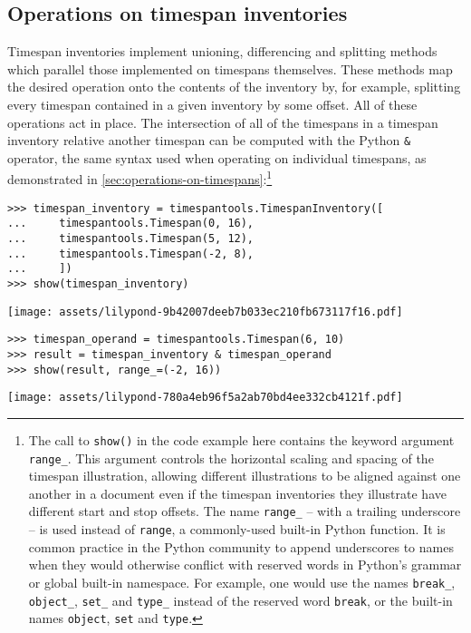 \subsection{Operations on timespan inventories} %

Timespan inventories implement unioning, differencing and splitting methods
which parallel those implemented on timespans themselves. These methods map the
desired operation onto the contents of the inventory by, for example, splitting
every timespan contained in a given inventory by some offset. All of these
operations act in place. The intersection of all of the timespans in a timespan
inventory relative another timespan can be computed with the Python \texttt{\&}
operator, the same syntax used when operating on individual timespans, as
demonstrated in \autoref{sec:operations-on-timespans}:\footnote{ The call to
\texttt{show()} in the code example here contains the keyword argument
\texttt{range\_}. This argument controls the horizontal scaling and spacing of
the timespan illustration, allowing different illustrations to be aligned
against one another in a document even if the timespan inventories they
illustrate have different start and stop offsets. The name \texttt{range\_} --
with a trailing underscore -- is used instead of \texttt{range}, a
commonly-used built-in Python function. It is common practice in the Python
community to append underscores to names when they would otherwise conflict
with reserved words in Python's grammar or global built-in namespace. For
example, one would use the names \texttt{break\_}, \texttt{object\_},
\texttt{set\_} and \texttt{type\_} instead of the reserved word \texttt{break},
or the built-in names \texttt{object}, \texttt{set} and \texttt{type}.}

\begin{comment}
<abjad>
timespan_inventory = timespantools.TimespanInventory([
    timespantools.Timespan(0, 16),
    timespantools.Timespan(5, 12),
    timespantools.Timespan(-2, 8),
    ])
show(timespan_inventory)
timespan_operand = timespantools.Timespan(6, 10)
result = timespan_inventory & timespan_operand
show(result, range_=(-2, 16))
</abjad>
\end{comment}

\begin{singlespacing}
\vspace{-0.5\baselineskip}
\begin{lstlisting}
>>> timespan_inventory = timespantools.TimespanInventory([
...     timespantools.Timespan(0, 16),
...     timespantools.Timespan(5, 12),
...     timespantools.Timespan(-2, 8),
...     ])
>>> show(timespan_inventory)
\end{lstlisting}
\noindent\texttt{[image: assets/lilypond-9b42007deeb7b033ec210fb673117f16.pdf]}
\begin{lstlisting}
>>> timespan_operand = timespantools.Timespan(6, 10)
>>> result = timespan_inventory & timespan_operand
>>> show(result, range_=(-2, 16))
\end{lstlisting}
\noindent\texttt{[image: assets/lilypond-780a4eb96f5a2ab70bd4ee332cb4121f.pdf]}
\end{singlespacing}

